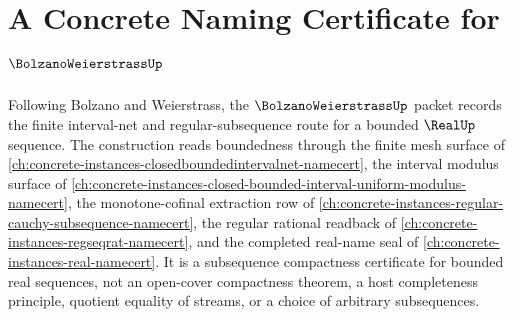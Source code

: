 \chapter{A Concrete Naming Certificate for $\BolzanoWeierstrassUp$}
\label{ch:concrete-instances-bolzanoweierstrass-namecert}

Following Bolzano and Weierstrass, the $\BolzanoWeierstrassUp$ packet records the finite interval-net and regular-subsequence route for a bounded $\RealUp$ sequence. The construction reads boundedness through the finite mesh surface of \autoref{ch:concrete-instances-closedboundedintervalnet-namecert}, the interval modulus surface of \autoref{ch:concrete-instances-closed-bounded-interval-uniform-modulus-namecert}, the monotone-cofinal extraction row of \autoref{ch:concrete-instances-regular-cauchy-subsequence-namecert}, the regular rational readback of \autoref{ch:concrete-instances-regseqrat-namecert}, and the completed real-name seal of \autoref{ch:concrete-instances-real-namecert}. It is a subsequence compactness certificate for bounded real sequences, not an open-cover compactness theorem, a host completeness principle, quotient equality of streams, or a choice of arbitrary subsequences.

